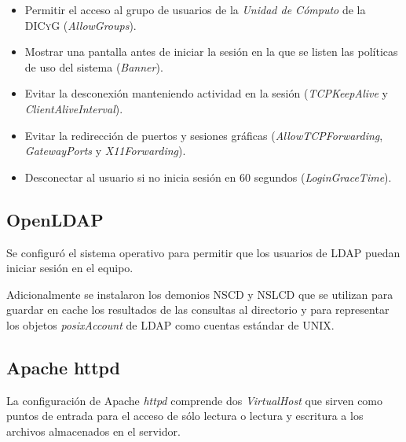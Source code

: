 \begin{itemize}
  \item Permitir el acceso al grupo de usuarios de la \textit{Unidad de C\'{o}mputo} de la \textsc{DICyG} (\textit{AllowGroups}).
  \item  Mostrar una pantalla antes de iniciar la sesi\'{o}n en la que se listen las pol\'{i}ticas de uso del sistema (\textit{Banner}).
  \item Evitar la desconexi\'{o}n manteniendo actividad en la sesi\'{o}n (\textit{TCPKeepAlive} y \textit{ClientAliveInterval}).
  \item Evitar la redirecci\'{o}n de puertos y sesiones gr\'{a}ficas (\textit{AllowTCPForwarding}, \textit{GatewayPorts} y \textit{X11Forwarding}).
  \item Desconectar al usuario si no inicia sesi\'{o}n en 60 segundos (\textit{LoginGraceTime}).
\end{itemize}


      \subsection {OpenLDAP}

Se configur\'{o} el sistema operativo para permitir que los usuarios de \textsc{LDAP} puedan iniciar sesi\'{o}n en el equipo.

Adicionalmente se instalaron los demonios \textsc{NSCD} y \textsc{NSLCD} que se utilizan para guardar en cache los resultados de las consultas al directorio y para representar los objetos \textit{posixAccount} de \textsc{LDAP} como cuentas est\'{a}ndar de \textsc{UNIX}.


      \subsection {Apache httpd}

La configuraci\'{o}n de Apache \textit{httpd} comprende dos \textit{VirtualHost} que sirven como puntos de entrada para el acceso de s\'{o}lo lectura o lectura y escritura a los archivos almacenados en el servidor.


